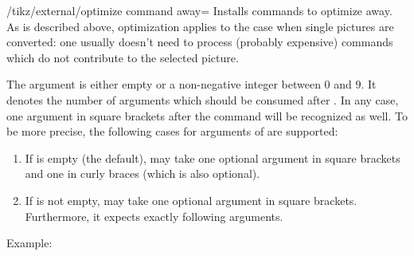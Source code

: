 {

\begin{key}{/tikz/external/optimize command away=}
    Installs commands to optimize  away. As is
    described above, optimization applies to the case when single pictures are
    converted: one usually doesn't need to process (probably expensive)
    commands which do not contribute to the selected picture.

    The argument  is either empty or a
    non-negative integer between $0$ and $9$. It denotes the number of
    arguments which should be consumed after . In
    any case, one argument in square brackets after the command will be
    recognized as well. To be more precise, the following cases for arguments
    of  are supported:
    \begin{enumerate}
        \item If  is empty (the default),
             may take one optional argument in
            square brackets and one in curly braces (which is also optional).
        \item If  is not empty,
             may take one optional argument in
            square brackets. Furthermore, it expects exactly  following arguments.
    \end{enumerate}

    Example:
\begin{codeexample}
\tikzset{external/optimize command away=\includegraphics}
\end{codeexample}

\begin{codeexample}
\newcommand{\myExpensiveMacro}[1]{Very expensive!}

\tikzset{external/optimize command away=\myExpensiveMacro}
\end{codeexample}

\begin{codeexample}
\newcommand{\myExpensiveMacroWithThreeArgs}[3]{Very expensive!}


\end{codeexample}
\end{key}}
